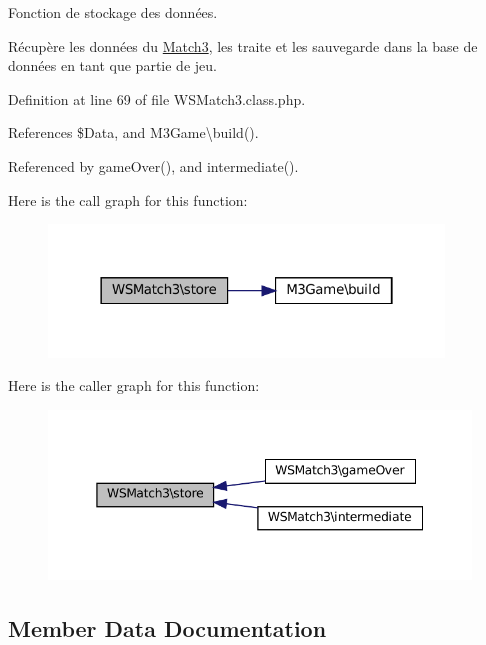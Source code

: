 Fonction de stockage des données.

Récupère les données du \hyperlink{class_match3}{Match3}, les traite et les sauvegarde dans la base de données en tant que partie de jeu. 

Definition at line 69 of file W\+S\+Match3.\+class.\+php.



References \$\+Data, and M3\+Game\textbackslash{}build().



Referenced by game\+Over(), and intermediate().

Here is the call graph for this function\+:\nopagebreak
\begin{figure}[H]
\begin{center}
\leavevmode
\includegraphics[width=298pt]{class_w_s_match3_a26d2ad6c89b5ec23676d9058351a85ad_cgraph}
\end{center}
\end{figure}
Here is the caller graph for this function\+:\nopagebreak
\begin{figure}[H]
\begin{center}
\leavevmode
\includegraphics[width=345pt]{class_w_s_match3_a26d2ad6c89b5ec23676d9058351a85ad_icgraph}
\end{center}
\end{figure}


\subsection{Member Data Documentation}
\mbox{\label{class_w_s_match3_a5d00b6220eaf523ce74cb85cee870f0a}} 
